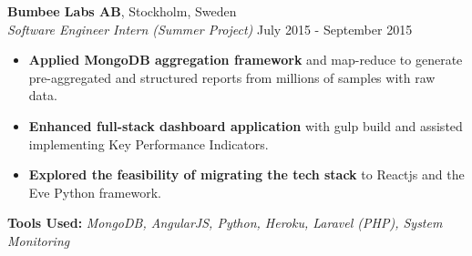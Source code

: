 \begin{minipage}[t]{0.61\textwidth}
\vspace{1em}

\noindent
\textbf{\Large Bumbee Labs AB}, \hfill Stockholm, Sweden\\
\textit{Software Engineer Intern (Summer Project)} \hfill July 2015 - September 2015
\begin{itemize}
\setlength{\itemsep}{0.5em}
    \item \textbf{Applied MongoDB aggregation framework} and map-reduce to generate pre-aggregated and structured reports from millions of samples with raw data.
    \item \textbf{Enhanced full-stack dashboard application} with gulp build and assisted implementing Key Performance Indicators.
    \item \textbf{Explored the feasibility of migrating the tech stack} to Reactjs and the Eve Python framework.
\end{itemize}
\vspace{0.2em}
\textbf{ Tools Used:} \textit{MongoDB, AngularJS, Python, Heroku, Laravel (PHP), System Monitoring}

\vfill

\end{minipage}
